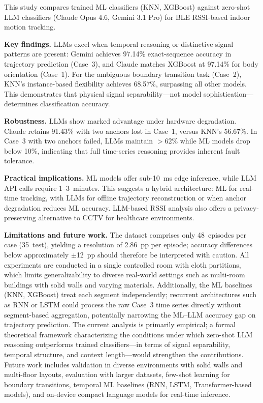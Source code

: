 \documentclass[conference]{IEEEtran}
\begin{document}
This study compares trained ML classifiers (KNN, XGBoost) against zero-shot LLM classifiers (Claude Opus 4.6, Gemini 3.1 Pro) for BLE RSSI-based indoor motion tracking.

\textbf{Key findings.} LLMs excel when temporal reasoning or distinctive signal patterns are present: Gemini achieves 97.14\% exact-sequence accuracy in trajectory prediction (Case~3), and Claude matches XGBoost at 97.14\% for body orientation (Case~1). For the ambiguous boundary transition task (Case~2), KNN's instance-based flexibility achieves 68.57\%, surpassing all other models. This demonstrates that physical signal separability---not model sophistication---determines classification accuracy.

\textbf{Robustness.} LLMs show marked advantage under hardware degradation. Claude retains 91.43\% with two anchors lost in Case~1, versus KNN's 56.67\%. In Case~3 with two anchors failed, LLMs maintain $>$62\% while ML models drop below 10\%, indicating that full time-series reasoning provides inherent fault tolerance.

\textbf{Practical implications.} ML models offer sub-10~ms edge inference, while LLM API calls require 1--3~minutes. This suggests a hybrid architecture: ML for real-time tracking, with LLMs for offline trajectory reconstruction or when anchor degradation reduces ML accuracy. LLM-based RSSI analysis also offers a privacy-preserving alternative to CCTV for healthcare environments.

\textbf{Limitations and future work.} The dataset comprises only 48~episodes per case (35~test), yielding a resolution of 2.86~pp per episode; accuracy differences below approximately $\pm$12~pp should therefore be interpreted with caution. All experiments are conducted in a single controlled room with cloth partitions, which limits generalizability to diverse real-world settings such as multi-room buildings with solid walls and varying materials. Additionally, the ML baselines (KNN, XGBoost) treat each segment independently; recurrent architectures such as RNN or LSTM could process the raw Case~3 time series directly without segment-based aggregation, potentially narrowing the ML--LLM accuracy gap on trajectory prediction. The current analysis is primarily empirical; a formal theoretical framework characterizing the conditions under which zero-shot LLM reasoning outperforms trained classifiers---in terms of signal separability, temporal structure, and context length---would strengthen the contributions. Future work includes validation in diverse environments with solid walls and multi-floor layouts, evaluation with larger datasets, few-shot learning for boundary transitions, temporal ML baselines (RNN, LSTM, Transformer-based models), and on-device compact language models for real-time inference.
\end{document}
